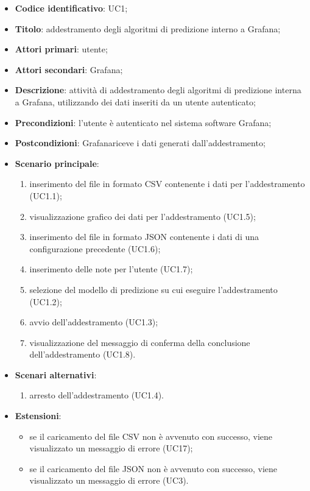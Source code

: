 \begin{itemize}
	\item \textbf{Codice identificativo}: UC1;
	\item \textbf{Titolo}: addestramento degli algoritmi di predizione interno a Grafana\glo;
	\item \textbf{Attori primari}: utente;
	\item \textbf{Attori secondari}: Grafana\glo;
	\item \textbf{Descrizione}: attività di addestramento degli algoritmi di predizione interna a Grafana\glo, utilizzando dei dati inseriti da un utente autenticato;
	\item \textbf{Precondizioni}: l'utente è autenticato nel sistema software Grafana\glo;
	\item \textbf{Postcondizioni}: Grafana\glosp riceve i dati generati dall'addestramento;
	\item \textbf{Scenario principale}: 
		\begin{enumerate}
			\item inserimento del file in formato CSV contenente i dati per l'addestramento (UC1.1);
			\item visualizzazione grafico dei dati per l'addestramento (UC1.5);
			\item inserimento del file in formato JSON contenente i dati di una configurazione precedente (UC1.6);
			\item inserimento delle note per l'utente (UC1.7);
			\item selezione del modello di predizione su cui eseguire l'addestramento (UC1.2);
			\item avvio dell'addestramento (UC1.3);
			\item visualizzazione del messaggio di conferma della conclusione dell'addestramento (UC1.8).
		\end{enumerate}
	\item \textbf{Scenari alternativi}:
		\begin{enumerate}
			\item arresto dell'addestramento (UC1.4).
		\end{enumerate}
	\item \textbf{Estensioni}:
	\begin{itemize}
		\item se il caricamento del file CSV non è avvenuto con successo, viene visualizzato un messaggio di errore (UC17);
		\item se il caricamento del file JSON non è avvenuto con successo, viene visualizzato un messaggio di errore (UC3).
	\end{itemize}
\end{itemize}

